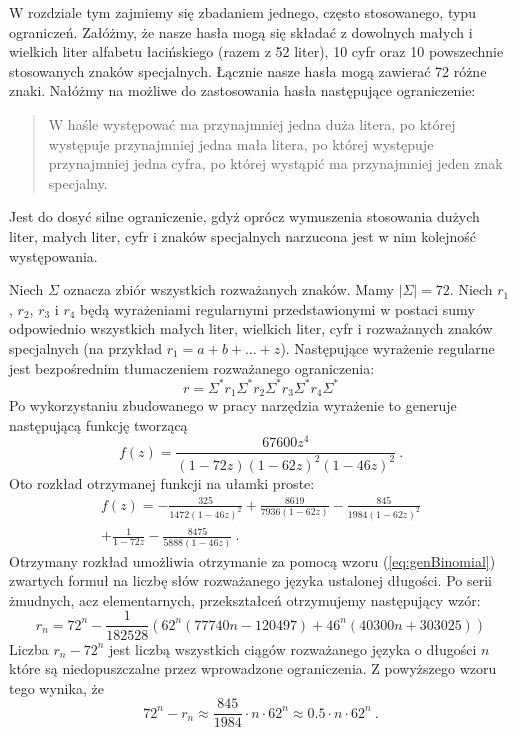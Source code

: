 W rozdziale tym zajmiemy się  zbadaniem jednego, często stosowanego, typu ograniczeń. Załóżmy, że nasze hasła mogą się składać z dowolnych małych i wielkich liter alfabetu łacińskiego (razem z 52 liter), 10 cyfr oraz 10 powszechnie stosowanych znaków specjalnych. Łącznie nasze hasła mogą zawierać 72 różne znaki. 
Nałóżmy na możliwe do zastosowania hasła następujące ograniczenie:
\begin{quote}
    W haśle występować ma przynajmniej jedna duża litera, po której występuje  przynajmniej jedna mała litera, po której występuje przynajmniej jedna cyfra, po której wystąpić ma przynajmniej jeden znak specjalny. 
\end{quote}
Jest do dosyć silne ograniczenie, gdyż oprócz wymuszenia stosowania dużych liter, małych liter, cyfr i znaków specjalnych narzucona jest w nim kolejność występowania.

Niech $\Sigma$ oznacza zbiór wszystkich rozważanych znaków. Mamy $|\Sigma| = 72$. 
Niech $r_1$, $r_2$, $r_3$ i $r_4$ będą wyrażeniami regularnymi przedstawionymi w postaci sumy odpowiednio wszystkich małych liter, wielkich liter, cyfr i rozważanych znaków specjalnych (na przykład $r_1=a+b+\ldots+z$). 
Następujące wyrażenie regularne jest bezpośrednim tłumaczeniem rozważanego ograniczenia:
$$
 r = \Sigma^*r_1\Sigma^*r_2\Sigma^*r_3\Sigma^*r_4\Sigma^*
$$
Po wykorzystaniu zbudowanego w pracy narzędzia  wyrażenie to generuje następującą funkcję tworzącą
$$
f(z) = \frac{67600z^4}{(1-72z)(1-62z)^2(1-46z)^2}~.
$$
Oto rozkład otrzymanej funkcji na ułamki proste:
\begin{gather*}
f(z) = -\frac{325}{1472 (1-46z)^2}+\frac{8619}{7936 (1-62z)}-\frac{845}{1984 (1-62z)^2}\\+\frac{1}{1-72z}-\frac{8475}{5888 (1-46z)}~.
\end{gather*}
Otrzymany rozkład umożliwia otrzymanie za pomocą wzoru (\ref{eq:genBinomial}) zwartych formuł na liczbę słów rozważanego języka ustalonej długości. Po serii żmudnych, acz elementarnych, przekształceń otrzymujemy następujący wzór:
$$
r_n = 72^n-\frac{1}{182528} (62^n (77740 n-120497)+46^n (40300 n+303025))
$$
Liczba $r_n - 72^n$ jest liczbą wszystkich ciągów rozważanego języka o długości $n$ które są niedopuszczalne przez wprowadzone ograniczenia.
Z powyższego wzoru tego wynika, że 
$$
  72^n - r_n \approx \frac{845}{1984}\cdot n \cdot 62^n \approx 0.5 \cdot n \cdot 62^n~.
$$ 

